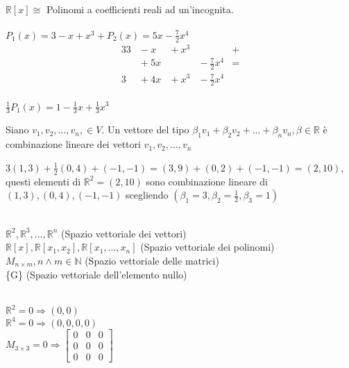 \begin{es}
	$\mathbb{R}[x] \cong$ Polinomi a coefficienti reali ad un'incognita.\\\\
	$P_{1}(x)=3-x+x^{3} + P_{2}(x)=5x-\frac{7}{2}x^{4}$
	\begin{alignat*}{3}
		3 &{}- x&{}+ x^{3}&  &{}+\\
		  &{}+ 5x&{} &{}- \frac{7}{2}x^{4}&{}=\\
		3 &{}+ 4x&{}+ x^{3}&{}- \frac{7}{2}x^{4}& 
	\end{alignat*}\\
	$\frac{1}{3}P_{1}(x)=1-\frac{1}{3}x+\frac{1}{3}x^{3}$
\end{es}

\begin{definizione}
	Siano $v_{1},v_{2},...,v_{n}, \in V$. Un vettore del tipo $\beta_1 v_1+\beta_2 v_2+...+\beta_n v_n, \beta\in \mathbb{R}$ è combinazione lineare dei vettori $v_{1},v_{2},...,v_{n}$
	\begin{es}
		$3(1,3)+\frac{1}{2}(0,4)+(-1,-1)=(3,9)+(0,2)+(-1,-1)=(2,10)$, questi elementi di $\mathbb{R}^2=(2,10)$ sono combinazione lineare di $(1,3),(0,4),(-1,-1)$ scegliendo $(\beta_1=3, \beta_2=\frac{1}{2}, \beta_3=1)$
	\end{es}
\end{definizione}

\begin{es}
	\phantom{}\\
    $\mathbb{R}^2, \mathbb{R}^3,...,\mathbb{R}^n$ (Spazio vettoriale dei vettori)\\
    $\mathbb{R}[x], \mathbb{R}[x_1,x_2], \mathbb{R}[x_1,...,x_n]$ (Spazio vettoriale dei polinomi)\\
    $M_{n\times m}, n\wedge m\in \mathbb{N}$ (Spazio vettoriale delle matrici)\\
    \{G\} (Spazio vettoriale dell'elemento nullo)
\end{es}

\begin{es}
	\phantom{}\\
	$\mathbb{R}^2=0 \Rightarrow (0,0)$\\
	$\mathbb{R}^4=0 \Rightarrow (0,0,0,0)$\\
	$M_{3\times3}=0\Rightarrow 
	\begin{bmatrix}
    0 & 0 & 0 \\
	0 & 0 & 0 \\
	0 & 0 & 0
	\end{bmatrix}$
\end{es}

